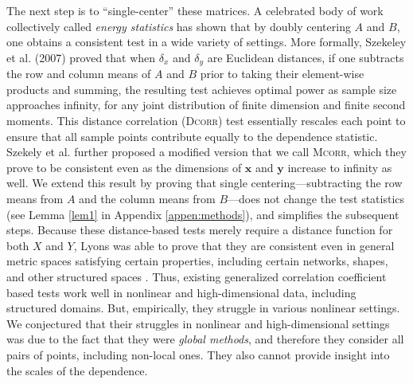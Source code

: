 \documentclass[11pt]{article}
\providecommand{\sct}[1]{{\normalfont\textsc{#1}}}
\providecommand{\mb}[1]{\boldsymbol{#1}}
\newcommand{\Dcorr}{\sct{Dcorr}}
\newcommand{\Mcorr}{\sct{Mcorr}}
\begin{document}
The next step is to ``single-center'' these matrices.  A celebrated body of  work collectively called \emph{energy statistics} \cite{RizzoSzekely2016} has shown that by doubly centering $A$ and $B$, one obtains a consistent test in a wide variety of settings.  
More formally, Szekeley et al. (2007) \cite{SzekelyRizzoBakirov2007} proved that when  $\delta_x$ and $\delta_y$  are  Euclidean distances, if one subtracts the row and column means of $A$ and $B$ prior to taking their element-wise products and summing, the resulting test achieves optimal power as 
sample size approaches infinity, for any joint distribution of finite dimension and finite second moments. 
This distance correlation (\Dcorr) test essentially rescales each point to ensure that all sample points contribute equally to the dependence statistic. 
Szekely et al. \cite{SzekelyRizzo2013a} further proposed a modified version that we call \Mcorr, which they prove to be consistent even as the dimensions of $\mb{x}$ and $\mb{y}$ increase to infinity as well.
We extend this result by proving that single centering---subtracting the row means from $A$ and the column means from $B$---does not change the test statistics (see Lemma \ref{lem1} in Appendix \ref{appen:methods}), and simplifies the subsequent steps.
Because these distance-based tests merely require a distance function for both $X$ and $Y$, Lyons was able to prove that they are consistent even in general metric spaces satisfying certain properties, including certain networks, shapes, and other structured spaces  \cite{Lyons2013}.
Thus, existing generalized correlation coefficient based tests  work well in nonlinear and high-dimensional data,  including structured domains. But, empirically, they struggle in various nonlinear settings. We conjectured that their struggles in nonlinear and high-dimensional settings was due to the fact that they were \emph{global methods}, and therefore they consider all pairs of points, including non-local ones. They also cannot provide insight into the scales of the dependence.
\end{document}
